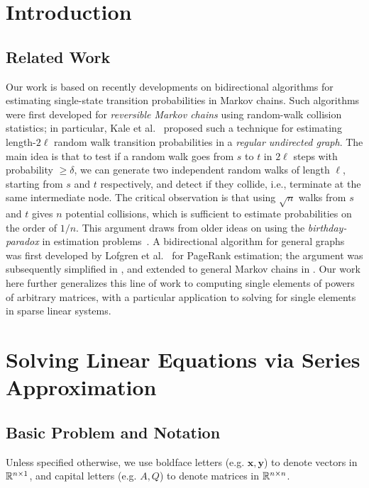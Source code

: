 \section{Introduction}


\subsection{Related Work}

Our work is based on recently developments on bidirectional algorithms for estimating single-state transition probabilities in Markov chains.
Such algorithms were first developed for \emph{reversible Markov chains} using random-walk collision statistics; in particular, Kale et al.~\cite{Kale2008} proposed such a technique for estimating length-$2\ell$ random walk transition probabilities in a \emph{regular undirected graph}.
The main idea is that to test if a random walk goes from $s$ to $t$ in $2\ell$ steps with probability $\geq\delta$, we can generate two independent random walks of length $\ell$, starting from $s$ and $t$ respectively, and detect if they collide, i.e., terminate at the same intermediate node. 
The critical observation is that using $\sqrt{n}$ walks from $s$ and $t$ gives $n$ potential collisions, which is sufficient to estimate probabilities on the order of $1/n$.
This argument draws from older ideas on using the \emph{birthday-paradox} in estimation problems~\cite{Motwani2007}.
A bidirectional algorithm for general graphs was first developed by Lofgren et al.~\cite{Lofgren2014} for PageRank estimation; the argument was subsequently simplified in \cite{lofgren2016personalized}, and extended to general Markov chains in \cite{banerjee2015fast}. 
Our work here further generalizes this line of work to computing single elements of powers of arbitrary matrices, with a particular application to solving for single elements in sparse linear systems.



\section{Solving Linear Equations via Series Approximation}

\subsection{Basic Problem and Notation}

Unless specified otherwise, we use boldface letters (e.g. $\mathbf{x},\mathbf{y}$) to denote vectors in $\mathbb{R}^{n\times 1}$, and capital letters (e.g. $A,Q$) to denote matrices in $\mathbb{R}^{n\times n}$.



